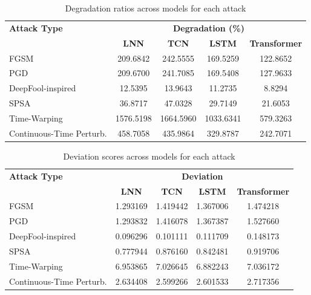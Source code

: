 \begin{table}[H]
    \centering
    \small
    \begin{tabular}{|l|cccc|}
    \hline
    \textbf{Attack Type} & \multicolumn{4}{c|}{\textbf{Degradation (\%)}} \\
    \cline{2-5}
     & \textbf{LNN} & \textbf{TCN} & \textbf{LSTM} & \textbf{Transformer} \\
    \hline
    FGSM                     & 209.6842 & 242.5555 & 169.5259 & 122.8652 \\
    PGD                      & 209.6700 & 241.7085 & 169.5408 & 127.9633 \\
    DeepFool-inspired        & 12.5395 & 13.9643 & 11.2735 & 8.8294 \\
    SPSA                     & 36.8717 & 47.0328 & 29.7149 & 21.6053 \\
    Time-Warping             & 1576.5198 & 1664.5960 & 1033.6341 & 579.3263 \\
    Continuous-Time Perturb. & 458.7058 & 435.9864 & 329.8787 & 242.7071 \\
    \hline
    \end{tabular}
    \caption{Degradation ratios across models for each attack}
    \label{tab:attack_results_degradation}
\end{table}

\begin{table}[H]
    \centering
    \small
    \begin{tabular}{|l|cccc|}
    \hline
    \textbf{Attack Type} & \multicolumn{4}{c|}{\textbf{Deviation}} \\
    \cline{2-5}
     & \textbf{LNN} & \textbf{TCN} & \textbf{LSTM} & \textbf{Transformer} \\
    \hline
    FGSM                     & 1.293169 & 1.419442 & 1.367006 & 1.474218 \\
    PGD                      & 1.293832 & 1.416078 & 1.367387 & 1.527660 \\
    DeepFool-inspired        & 0.096296 & 0.101111 & 0.111709 & 0.148173 \\
    SPSA                     & 0.777944 & 0.876160 & 0.842481 & 0.919706 \\
    Time-Warping             & 6.953865 & 7.026645 & 6.882243 & 7.036172 \\
    Continuous-Time Perturb. & 2.634408 & 2.599266 & 2.601533 & 2.717356 \\
    \hline
    \end{tabular}
    \caption{Deviation scores across models for each attack}
    \label{tab:attack_results_deviation}
\end{table}

